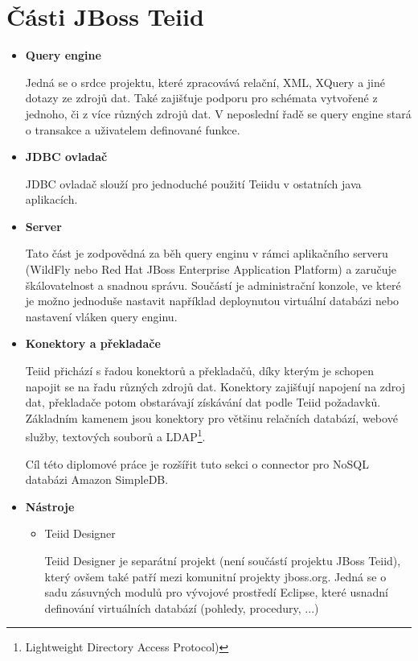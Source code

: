 \documentclass[oneside,12pt,final]{fithesis2}
\begin{document}
\section{Části JBoss Teiid}
\begin{itemize}
 \item \textbf{Query engine}
 
 Jedná se o srdce projektu, které zpracovává relační, XML, XQuery a jiné dotazy ze zdrojů dat. Také zajišťuje podporu pro schémata vytvořené z jednoho, či z více různých zdrojů dat. V neposlední řadě se query engine stará o transakce a uživatelem definované funkce.
 
 \item \textbf{JDBC ovladač}
 
 JDBC ovladač slouží pro jednoduché použití Teiidu v ostatních java aplikacích.
 
 \item \textbf{Server}
 
 Tato část je zodpovědná za běh query enginu v rámci aplikačního serveru (WildFly nebo Red Hat JBoss Enterprise Application Platform) a zaručuje škálovatelnost a snadnou správu. Součástí je administrační konzole, ve které je možno jednoduše nastavit například deploynutou virtuální databázi nebo nastavení vláken query enginu.
 
 \item \textbf{Konektory a překladače}
 
 Teiid přichází s řadou konektorů a překladačů, díky kterým je schopen napojit se na řadu různých zdrojů dat. Konektory zajišťují napojení na zdroj dat, překladače potom obstarávají získávání dat podle Teiid požadavků. Základním kamenem jsou konektory pro většinu relačních databází, webové služby, textových souborů a LDAP\footnote{Lightweight Directory Access Protocol)}.
 
 Cíl této diplomové práce je rozšířit tuto sekci o connector pro NoSQL databázi Amazon SimpleDB.
 
 \item \textbf{Nástroje}
 
  \begin{itemize}
  \item Teiid Designer
  
  Teiid Designer je separátní projekt (není součástí projektu JBoss Teiid), který ovšem také patří mezi komunitní projekty jboss.org. Jedná se o sadu zásuvných modulů pro vývojové prostředí Eclipse, které usnadní definování virtuálních databází (pohledy, procedury, ...)
  

\end{itemize}
\end{itemize}
\end{document}
